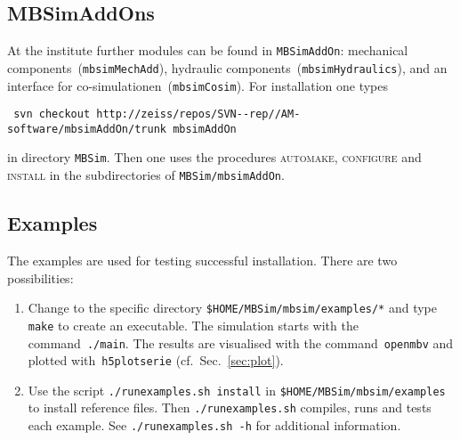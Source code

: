 \subsection{MBSimAddOns}
At the institute further modules can be found in \texttt{MBSimAddOn}: mechanical components~(\texttt{mbsimMechAdd}), hydraulic components~(\texttt{mbsimHydraulics}), and an interface for co-simulationen~(\texttt{mbsimCosim}). For installation one types
\begin{verbatim}
 svn checkout http://zeiss/repos/SVN--rep//AM-software/mbsimAddOn/trunk mbsimAddOn
\end{verbatim}
in directory \texttt{MBSim}. Then one uses the procedures \textsc{automake, configure} and \textsc{install} in the subdirectories of \texttt{MBSim/mbsimAddOn}.

\subsection{\MBSim Examples}
The examples are used for testing successful installation. There are two possibilities:
\begin{enumerate}
\item Change to the specific directory \texttt{\$HOME/MBSim/mbsim/examples/*} and type \texttt{make} to create an executable. The simulation starts with the command~\texttt{./main}. The results are visualised with the command~\texttt{openmbv} and plotted with~\texttt{h5plotserie} (cf.~Sec.~\ref{sec:plot}).
\item Use the script \texttt{./runexamples.sh install} in \texttt{\$HOME/MBSim/mbsim/examples} to install reference files. Then \texttt{./runexamples.sh} compiles, runs and tests each example. See \texttt{./runexamples.sh -h} for additional information.
\end{enumerate}

